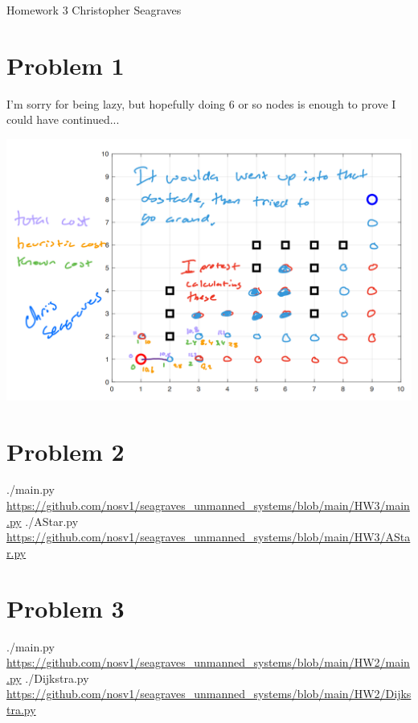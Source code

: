 \documentclass{article}
\begin{document}
    \raggedright
    Homework 3 \break
    Christopher Seagraves

    \section*{Problem 1}
        \begin{minipage}{\linewidth}
            \raggedright
            I'm sorry for being lazy, but hopefully doing 6 or so nodes is enough to prove I could have continued...
            \begin{center}
                \includegraphics[width=\linewidth]{HW3P1 A Star by hand.png}
            \end{center}
        \end{minipage}
    
        \section*{Problem 2}
            \begin{minipage}{\linewidth}
                \raggedright
                ./main.py \break
                \url{https://github.com/nosv1/seagraves_unmanned_systems/blob/main/HW3/main.py} \break
                ./AStar.py \break
                \url{https://github.com/nosv1/seagraves_unmanned_systems/blob/main/HW3/AStar.py}
            \end{minipage}

        \section*{Problem 3}
            \begin{minipage}{\linewidth}
                \raggedright
                ./main.py \break
                \url{https://github.com/nosv1/seagraves_unmanned_systems/blob/main/HW2/main.py} \break
                ./Dijkstra.py \break
                \url{https://github.com/nosv1/seagraves_unmanned_systems/blob/main/HW2/Dijkstra.py}
            \end{minipage}
\end{document}

